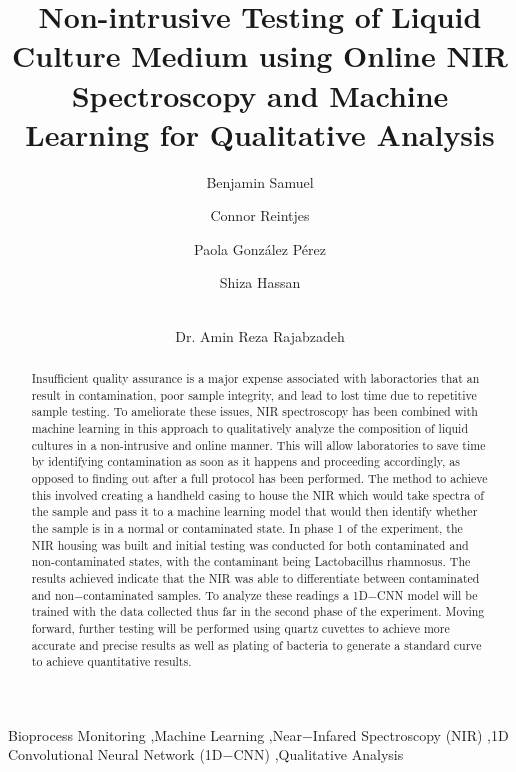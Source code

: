 \documentclass[final, 3p, 11pt]{elsarticle}
\begin{document}
\begin{frontmatter}


\title{Non-intrusive Testing of Liquid Culture Medium using Online NIR Spectroscopy and Machine Learning for Qualitative Analysis}

\author[1]{Benjamin Samuel}
\author[1]{Connor Reintjes}
\author[1]{Paola Gonz\'alez P\'erez}
\author[1]{Shiza Hassan}
\author[1]{\\Dr. Amin Reza Rajabzadeh} %



\begin{abstract}
Insufficient quality assurance is a major expense associated with laboractories that an result in contamination, poor sample integrity, and lead to lost time due to repetitive sample testing. To ameliorate these issues, NIR spectroscopy has been combined with machine learning in this approach to qualitatively analyze the composition of liquid cultures in a non-intrusive and online manner. This will allow laboratories to save time by identifying contamination as soon as it happens and proceeding accordingly, as opposed to finding out after a full protocol has been performed. The method to achieve this involved creating a handheld casing to house the NIR which would take spectra of the sample and pass it to a machine learning model that would then identify whether the sample is in a normal or contaminated state. In phase 1 of the experiment, the NIR housing was built and initial testing was conducted for both contaminated and non-contaminated states, with the contaminant being Lactobacillus rhamnosus. The results achieved indicate that the NIR was able to differentiate between contaminated and non$-$contaminated samples. To analyze these readings a 1D$-$CNN model will be trained with the data collected thus far in the second phase of the experiment. Moving forward, further testing will be performed using quartz cuvettes to achieve more accurate and precise results as well as plating of bacteria to generate a standard curve to achieve quantitative results. 

\end{abstract}

\begin{keyword}
Bioprocess Monitoring \sep Machine Learning \sep Near$-$Infared Spectroscopy (NIR) \sep 1D Convolutional Neural Network (1D$-$CNN) \sep Qualitative Analysis
\end{keyword}

\end{frontmatter}
\end{document}
